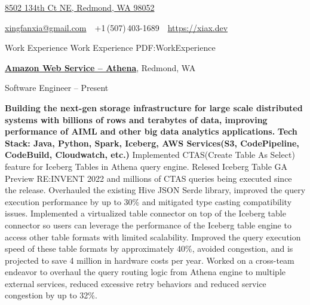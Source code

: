 \documentclass[a4paper,MMMyyyy,nonstopmode]{simpleresumecv}
\newcommand{\CVAuthor}{Xingfan Xia}
\newcommand{\CVWebpage}{https://xiax.dev}
\begin{document}

\Title{\CVAuthor}

\begin{SubTitle}
\href{https://www.google.com/maps/place/8502+134th+Ct+NE,+Redmond,+WA+98052}
{8502 134th Ct NE, Redmond, WA 98052}
\par
\href{mailto:xingfanxia@gmail.com}
{xingfanxia@gmail.com}
\,\SubBulletSymbol\,
+1\,(507)\,403-1689
\,\SubBulletSymbol\,
\href{\CVWebpage}
{\url{\CVWebpage}}
\end{SubTitle}

\begin{Body}

\Section
{Work\newline
Experience}
{Work Experience}
{PDF:WorkExperience}

\Entry
\href{https://aws.amazon.com/athena/}
{\textbf{Amazon Web Service -- Athena}},
Redmond, WA

\Gap
\BulletItem
Software Engineer
\hfill
{} --
Present
\begin{Detail}
\SubBulletItem
\textbf{Building the next-gen storage infrastructure for large scale distributed systems with billions of rows and terabytes of data, improving performance of AIML and other big data analytics applications.}
\SubBulletItem \textbf{Tech Stack: Java, Python, Spark, Iceberg, AWS Services(S3, CodePipeline, CodeBuild, Cloudwatch, etc.)}
\SubBulletItem
Implemented CTAS(Create Table As Select) feature for Iceberg Tables in Athena query engine. Relesed Iceberg Table GA Preview RE:INVENT 2022 and millions of CTAS queries being executed since the release.
\SubBulletItem
Overhauled the existing Hive JSON Serde library, improved the query execution performance by up to 30\% and mitigated type casting compatibility issues.
\SubBulletItem
Implemented a virtualized table connector on top of the Iceberg table connector so users can leverage the performance of the Iceberg table engine to access other table formats with limited scalability. 
Improved the query execution speed of these table formats by approximately 40\%, avoided congestion, and is projected to save 4 million in hardware costs per year.
\SubBulletItem
Worked on a cross-team endeavor to overhaul the query routing logic from Athena engine to multiple external services, reduced excessive retry behaviors and reduced service congestion by up to 32\%.
\end{Detail}


\end{Body}
\end{document}
